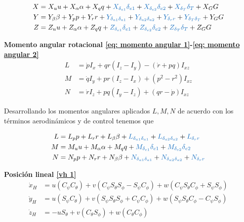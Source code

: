 \begin{align}
    X    &= X_u u + X_{\alpha}\alpha + X_q q + \textcolor{RoyalBlue}{X_{\delta_{e1}} \delta_{e1}}  + \textcolor{RoyalBlue}{X_{\delta_{e2}} \delta_{e2}} + \textcolor{RoyalBlue}{X_{\delta_{T}} \delta_{T}} + X_{G}G \\
    Y &= Y_{\beta} \beta + Y_{p}p + Y_{r} r + \textcolor{RoyalBlue}{Y_{\delta_{a1} \delta_{a1}}} + \textcolor{RoyalBlue}{Y_{\delta_{a2} \delta_{a2}}}  + \textcolor{RoyalBlue}{Y_{\delta_{r}r}} + \textcolor{RoyalBlue}{Y_{\delta_{T} \delta_{T}}} + Y_{G} G \\
    Z &= Z_u u + Z_{\alpha}\alpha + Z_q q + \textcolor{RoyalBlue}{Z_{\delta_{e1}} \delta_{e1}}  + \textcolor{RoyalBlue}{Z_{\delta_{e2}} \delta_{e2}} + \textcolor{RoyalBlue}{Z_{\delta_{T}} \delta_{T}} +  Z_{G}G  \\
\end{align}


\textbf{Momento angular rotacional \ref{eq: momento angular 1}-\ref{eq: momento angular 2}}\\
\begin{align}
\label{eq momentos ya 1}
    L &= \dot p I_{x} + qr(I_{z} - I_{y}) - (\dot r + pq)I_{xz} \\
    M &= \dot q I_{y} + pr(I_{z} - I_{x}) + (p^2 - r^2)I_{xz} \\
    N &= \dot r I_{z} + pq(I_{y} - I_{z}) + (qr - \dot p)I_{xz}
\label{eq momentos ya 2}
\end{align}

Desarrollando los momentos angulares aplicados $L,M,N$ de acuerdo con los términos aerodinámicos y de control tenemos que

\begin{align}
    L &= L_{p}p + L_{r}r + L_{\beta}\beta + \textcolor{RoyalBlue}{L_{\delta_{a1} \delta_{a1}}} + \textcolor{RoyalBlue}{L_{\delta_{a2} \delta_{a2}}}  + \textcolor{RoyalBlue}{L_{\delta_{r}r}} \\
    M &= M_{u}u + M_{\alpha}\alpha + M_{q}q + \textcolor{RoyalBlue}{M_{\delta_{e1}} \delta_{e1}}  + \textcolor{RoyalBlue}{M_{\delta_{e2}} \delta_{e2}} \\
    N &= N_{p}p + N_{r}r + N_{\beta}\beta + \textcolor{RoyalBlue}{N_{\delta_{a1} \delta_{a1}}} + \textcolor{RoyalBlue}{N_{\delta_{a2} \delta_{a2}}}  + \textcolor{RoyalBlue}{N_{\delta_{r}r}}
\end{align}

\textbf{Posición lineal \ref{vh 1}}
\begin{align}
\label{posi lineal 1}
    \dot x_H &= u(C_{\psi} C_{\theta}) + v (C_{\psi} S_{\theta} S_{\phi} - S_{\psi} C_{\phi}) + w (C_{\psi} S_{\theta} C_{\phi} + S_{\psi} S_{\phi})  \\
    \dot y_H &= u(S_{\psi} C_{\theta}) + v (S_{\psi} S_{\theta} S_{\phi} + C_{\psi} C_{\phi}) + w (S_{\psi} S_{\theta} C_{\phi} - C_{\psi} S_{\phi})  \\
    \dot z_H &= -u S_{\theta} + v (C_{\theta} S_{\phi}) + w (C_{\theta} C_{\phi}) 
\label{posi lineal 2}
\end{align}


